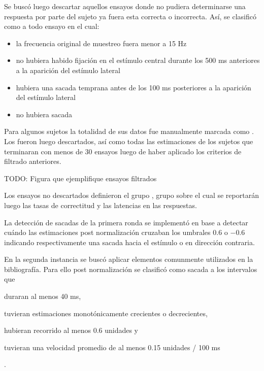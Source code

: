   Se buscó luego descartar aquellos ensayos donde no pudiera determinarse una
  respuesta por parte del sujeto ya fuera esta correcta o incorrecta.
  Así, se clasificó como \outlier a todo ensayo en el cual:
  \begin{itemize}
    \item la frecuencia original de muestreo fuera menor a 15 Hz
    \item no hubiera habido fijación en el estímulo central durante los 500 ms
      anteriores a la aparición del estímulo lateral
    \item hubiera una sacada temprana antes de los 100 ms posteriores a la
      aparición del estímulo lateral
    \item no hubiera sacada
  \end{itemize}
  Para algunos sujetos la totalidad de sus datos fue manualmente marcada como
  \outlier.
  Los \outliers fueron luego descartados, así como todas las estimaciones de
  los sujetos que terminaran con menos de 30 ensayos luego de haber aplicado
  los criterios de filtrado anteriores.

  TODO: Figura que ejemplifique ensayos filtrados

  Los ensayos no descartados definieron el grupo \inlier, grupo sobre el cual
  se reportarán luego las tasas de correctitud y las latencias en las
  respuestas.

  La detección de sacadas de la primera ronda se implementó en base a detectar
  cuándo las estimaciones post normalización cruzaban los umbrales $0.6$ o
  $-0.6$ indicando respectivamente una sacada hacia el estímulo o en dirección
  contraria.

  En la segunda instancia se buscó aplicar elementos comunmente utilizados en
  la bibliografía.
  Para ello post normalización se clasificó como sacada a los intervalos que
  \begin{enumerate*}
    \item duraran al menos 40 ms,
    \item tuvieran estimaciones monotónicamente crecientes o decrecientes,
    \item hubieran recorrido al menos 0.6 unidades y
    \item tuvieran una velocidad promedio de al menos 0.15 unidades / 100 ms
  \end{enumerate*}.
